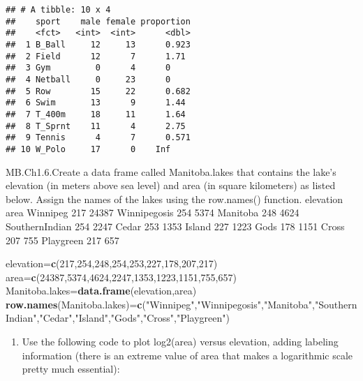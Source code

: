 \documentclass[
]{article}
\newenvironment{Shaded}{\begin{snugshade}}{\end{snugshade}}
\newcommand{\DecValTok}[1]{\textcolor[rgb]{0.00,0.00,0.81}{#1}}
\newcommand{\KeywordTok}[1]{\textcolor[rgb]{0.13,0.29,0.53}{\textbf{#1}}}
\newcommand{\NormalTok}[1]{#1}
\newcommand{\StringTok}[1]{\textcolor[rgb]{0.31,0.60,0.02}{#1}}
\providecommand{\tightlist}{%
  \setlength{\itemsep}{0pt}\setlength{\parskip}{0pt}}
\begin{document}
\begin{verbatim}
## # A tibble: 10 x 4
##    sport    male female proportion
##    <fct>   <int>  <int>      <dbl>
##  1 B_Ball     12     13      0.923
##  2 Field      12      7      1.71 
##  3 Gym         0      4      0    
##  4 Netball     0     23      0    
##  5 Row        15     22      0.682
##  6 Swim       13      9      1.44 
##  7 T_400m     18     11      1.64 
##  8 T_Sprnt    11      4      2.75 
##  9 Tennis      4      7      0.571
## 10 W_Polo     17      0    Inf
\end{verbatim}

MB.Ch1.6.Create a data frame called Manitoba.lakes that contains the
lake's elevation (in meters above sea level) and area (in square
kilometers) as listed below. Assign the names of the lakes using the
row.names() function. elevation area Winnipeg 217 24387 Winnipegosis 254
5374 Manitoba 248 4624 SouthernIndian 254 2247 Cedar 253 1353 Island 227
1223 Gods 178 1151 Cross 207 755 Playgreen 217 657

\begin{Shaded}
\begin{Highlighting}[]
\NormalTok{elevation=}\KeywordTok{c}\NormalTok{(}\DecValTok{217}\NormalTok{,}\DecValTok{254}\NormalTok{,}\DecValTok{248}\NormalTok{,}\DecValTok{254}\NormalTok{,}\DecValTok{253}\NormalTok{,}\DecValTok{227}\NormalTok{,}\DecValTok{178}\NormalTok{,}\DecValTok{207}\NormalTok{,}\DecValTok{217}\NormalTok{)}
\NormalTok{area=}\KeywordTok{c}\NormalTok{(}\DecValTok{24387}\NormalTok{,}\DecValTok{5374}\NormalTok{,}\DecValTok{4624}\NormalTok{,}\DecValTok{2247}\NormalTok{,}\DecValTok{1353}\NormalTok{,}\DecValTok{1223}\NormalTok{,}\DecValTok{1151}\NormalTok{,}\DecValTok{755}\NormalTok{,}\DecValTok{657}\NormalTok{)}
\NormalTok{Manitoba.lakes=}\KeywordTok{data.frame}\NormalTok{(elevation,area)}
\KeywordTok{row.names}\NormalTok{(Manitoba.lakes)=}\KeywordTok{c}\NormalTok{(}\StringTok{"Winnipeg"}\NormalTok{,}\StringTok{"Winnipegosis"}\NormalTok{,}\StringTok{"Manitoba"}\NormalTok{,}\StringTok{"SouthernIndian"}\NormalTok{,}\StringTok{"Cedar"}\NormalTok{,}\StringTok{"Island"}\NormalTok{,}\StringTok{"Gods"}\NormalTok{,}\StringTok{"Cross"}\NormalTok{,}\StringTok{"Playgreen"}\NormalTok{)}
\end{Highlighting}
\end{Shaded}

\begin{enumerate}
\def\labelenumi{(\alph{enumi})}
\tightlist
\item
  Use the following code to plot log2(area) versus elevation, adding
  labeling information (there is an extreme value of area that makes a
  logarithmic scale pretty much essential):
\end{enumerate}
\end{document}
